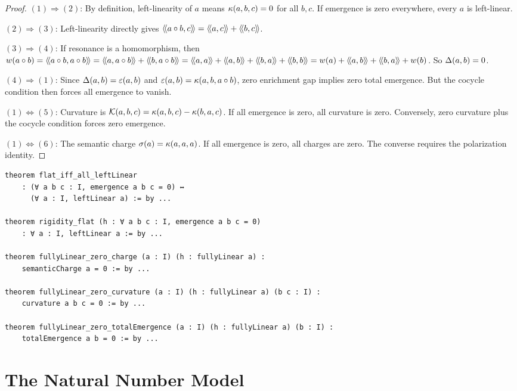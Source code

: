 \begin{proof}
$(1) \Rightarrow (2)$: By definition, left-linearity of $a$ means
$\kappa(a, b, c) = 0$ for all $b, c$. If emergence is zero everywhere,
every $a$ is left-linear.

$(2) \Rightarrow (3)$: Left-linearity directly gives
$\langle\!\langle a \circ b, c \rangle\!\rangle = \langle\!\langle a, c \rangle\!\rangle + \langle\!\langle b, c \rangle\!\rangle$.

$(3) \Rightarrow (4)$: If resonance is a homomorphism, then
$\weight{a \compose b} = \rs{a \compose b}{a \compose b}
= \rs{a}{a \compose b} + \rs{b}{a \compose b}
= \rs{a}{a} + \rs{a}{b} + \rs{b}{a} + \rs{b}{b}
= \weight{a} + \rs{a}{b} + \rs{b}{a} + \weight{b}$.
So $\Delta(a,b) = 0$.

$(4) \Rightarrow (1)$: Since $\Delta(a,b) = \varepsilon(a,b)$ and
$\varepsilon(a,b) = \kappa(a, b, a \circ b)$, zero enrichment gap implies
zero total emergence. But the cocycle condition then forces all emergence to vanish.

$(1) \Leftrightarrow (5)$: Curvature is $\mathcal{K}(a,b,c) = \kappa(a,b,c) - \kappa(b,a,c)$.
If all emergence is zero, all curvature is zero. Conversely, zero curvature plus
the cocycle condition forces zero emergence.

$(1) \Leftrightarrow (6)$: The semantic charge $\sigma(a) = \kappa(a,a,a)$.
If all emergence is zero, all charges are zero. The converse requires the
polarization identity.
\end{proof}

\begin{lstlisting}[caption={Flatness characterization (IDT\_v3\_Emergence.lean)}]
theorem flat_iff_all_leftLinear
    : (∀ a b c : I, emergence a b c = 0) ↔
      (∀ a : I, leftLinear a) := by ...

theorem rigidity_flat (h : ∀ a b c : I, emergence a b c = 0)
    : ∀ a : I, leftLinear a := by ...

theorem fullyLinear_zero_charge (a : I) (h : fullyLinear a) :
    semanticCharge a = 0 := by ...

theorem fullyLinear_zero_curvature (a : I) (h : fullyLinear a) (b c : I) :
    curvature a b c = 0 := by ...

theorem fullyLinear_zero_totalEmergence (a : I) (h : fullyLinear a) (b : I) :
    totalEmergence a b = 0 := by ...
\end{lstlisting}


\section{The Natural Number Model}

